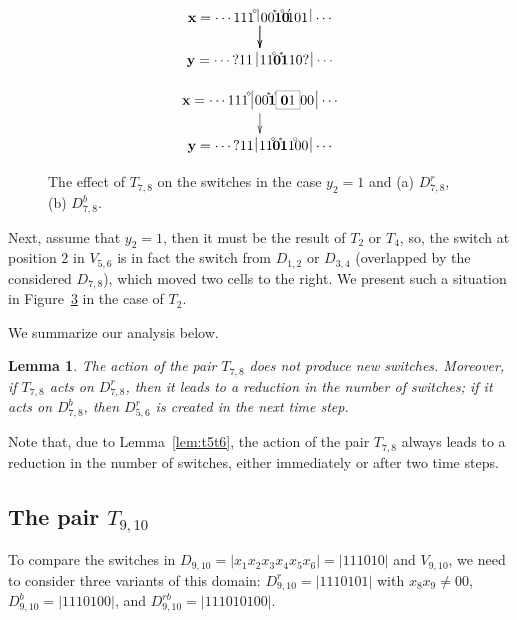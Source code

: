 \documentclass{sn-jnl}
\newtheorem{lem}{Lemma}%
\newcommand{\lllp}{\vline}
\newcommand{\bx}{\mathbf{x}}
\newcommand{\by}{\mathbf{y}}
\newcommand{\gn}[1]{\!^{{}^{{#1}}}\!\!}
\begin{document}
\begin{figure}[h!b]
    \centering
    \begin{subfigure}{0.45\textwidth}
{\scriptsize\[
\xymatrix@C=0.2cm@R=0.5cm{ 
\bx = \cdots 111\gn{\diamond}\;\lllp \, 00\gn{*}\boldsymbol{1}\gn{\circ}\boldsymbol{0}\gn{\prime} \ar[d]  101\,\lllp\,\cdots\ar[d]  \\
\by = \cdots {?}11 \;\lllp \,11\gn{\diamond}\boldsymbol{0}\gn{*}\boldsymbol{1}10?  \,\lllp\,\cdots   
}
\]}
    \caption{}
    \label{fig:t7t8(a)-cd}
\end{subfigure}
\hfill
 \begin{subfigure}{0.45\textwidth}
{\scriptsize\[
\xymatrix@C=0.2cm@R=0.5cm{ 
\bx = \cdots 111\gn{\diamond}\;\lllp \, 00\gn{*}\boldsymbol{1}\gn{\circ} \fcolorbox{gray}{white}{{\bf{0}}1} 00\,\lllp\,\cdots \ar[d]   \\
\by = \cdots {?}11\,\lllp\,11\gn{\diamond}\boldsymbol{0}\gn{*}\boldsymbol{1}1\gn{\circ}00  \,\lllp\,\cdots  
}
\]}
    \caption{}
    \label{fig:t7t8(b)-cd}
\end{subfigure}
\caption{The effect of $T_{7,8}$ on the switches in the case $y_2=1$ and  
        (a) $D_{7,8}^r$, (b) $D_{7,8}^b$.}
\label{fig:t7t8-cd}
\end{figure}

Next, assume that $y_2=1$, then it must be the result of $T_2$ or $T_4$, so, the switch at position 2 in $V_{5,6}$ is in fact the switch from $D_{1,2}$  or $D_{3,4}$ (overlapped by the considered $D_{7,8}$), which moved two cells to the right. We present such a situation in Figure~\ref{fig:t7t8-cd} in the case of $T_2$.

We summarize our analysis below.

\begin{lem}\label{lem:t7t8}
The action of the pair $T_{7,8}$ does not produce new switches. Moreover, if $T_{7,8}$ acts on $D_{7,8}^r$, then it leads to a reduction 
in the number of switches; if it acts on $D_{7,8}^b$, then $D_{5,6}^r$ is created in the next time step.
\end{lem}

Note that, due to Lemma~\ref{lem:t5t6}, the action of the pair $T_{7,8}$ always leads to a reduction in the number of switches, either immediately or after two time steps.

\subsection{The pair $T_{9,10}$} 
To compare the switches in $D_{9,10}=|x_1x_{2}x_{3}x_{4}x_{5}x_{6}|=|111010|$ and $V_{9,10}$, we need to consider three variants of this domain: $D_{9,10}^r=|1110101|$ with $x_8x_9\neq 00$, $D_{9,10}^b=|1110100|$, and $D_{9,10}^{rb}=|111010100|$.
\end{document}
